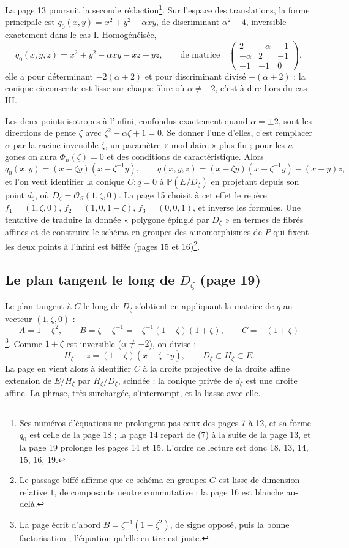 \documentclass[11pt,a4paper]{article}
\begin{document}
La page 13 poursuit la seconde rédaction\footnote{Ses numéros d'équations ne
prolongent pas ceux des pages 7 à 12, et sa forme $q_0$ est celle de la page
18 ; la page 14 repart de (7) à la suite de la page 13, et la page 19 prolonge
les pages 14 et 15. L'ordre de lecture est donc 18, 13, 14, 15, 16, 19.}. Sur
l'espace des translations, la forme principale est $q_0(x, y) = x^2 + y^2 -
\alpha xy$, de discriminant $\alpha^2 - 4$, inversible exactement dans le cas I.
Homogénéisée,
\[
  q_0(x, y, z) = x^2 + y^2 - \alpha xy - xz - yz, \qquad
  \text{de matrice} \quad
  \begin{pmatrix} 2 & -\alpha & -1 \\ -\alpha & 2 & -1 \\ -1 & -1 & 0 \end{pmatrix},
\]
elle a pour déterminant $-2(\alpha + 2)$ et pour discriminant divisé $-(\alpha +
2)$ : la conique circonscrite est lisse sur chaque fibre où $\alpha \neq -2$,
c'est-à-dire hors du cas III.

Les deux points isotropes à l'infini, confondus exactement quand $\alpha = \pm 2$,
sont les directions de pente $\zeta$ avec $\zeta^2 - \alpha\zeta + 1 = 0$. Se donner
l'une d'elles, c'est remplacer $\alpha$ par la racine inversible $\zeta$, un
paramètre « modulaire » plus fin ; pour les $n$-gones on aura $\Phi_n(\zeta) = 0$
et des conditions de caractéristique. Alors
\[
  q_0(x, y) = (x - \zeta y)(x - \zeta^{-1}y), \qquad
  q(x, y, z) = (x - \zeta y)(x - \zeta^{-1}y) - (x + y)z ,
\]
et l'on veut identifier la conique $C : q = 0$ à $\mathbb{P}(E/D_\zeta)$ en projetant
depuis son point $d_\zeta$, où $D_\zeta = \mathcal{O}_S(1, \zeta, 0)$. La page 15
choisit à cet effet le repère $f_1 = (1, \zeta, 0)$, $f_2 = (1, 0, 1 - \zeta)$, $f_3
= (0, 0, 1)$, et inverse les formules. Une tentative de traduire la donnée
« polygone épinglé par $D_\zeta$ » en termes de fibrés affines et de construire
le schéma en groupes des automorphismes de $P$ qui fixent les deux points à
l'infini est biffée (pages 15 et 16)\footnote{Le passage biffé affirme que ce
schéma en groupes $G$ est lisse de dimension relative $1$, de composante neutre
commutative ; la page 16 est blanche au-delà.}.

\subsection*{Le plan tangent le long de $D_\zeta$ (page 19)}

Le plan tangent à $C$ le long de $D_\zeta$ s'obtient en appliquant la matrice de
$q$ au vecteur $(1, \zeta, 0)$ :
\[
  A = 1 - \zeta^2, \qquad B = \zeta - \zeta^{-1} = -\zeta^{-1}(1 - \zeta)(1 + \zeta),
  \qquad C = -(1 + \zeta)
\]
\footnote{La page écrit d'abord $B = \zeta^{-1}(1 - \zeta^2)$, de signe opposé,
puis la bonne factorisation ; l'équation qu'elle en tire est juste.}. Comme $1
+ \zeta$ est inversible ($\alpha \neq -2$), on divise :
\[
  H_\zeta : \quad z = (1 - \zeta)(x - \zeta^{-1}y), \qquad D_\zeta \subset H_\zeta
  \subset E .
\]
La page en vient alors à identifier $C$ à la droite projective de la droite
affine extension de $E/H_\zeta$ par $H_\zeta/D_\zeta$, scindée : la conique privée de
$d_\zeta$ est une droite affine. La phrase, très surchargée, s'interrompt, et la
liasse avec elle.
\end{document}
